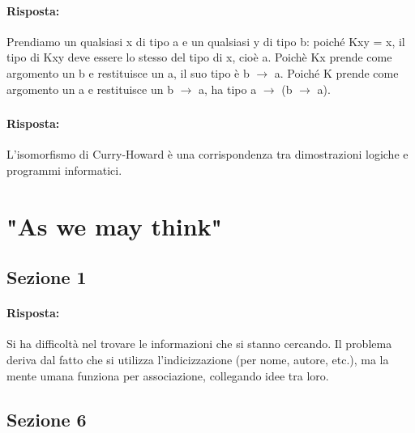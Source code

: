 \paragraph{Risposta:} Prendiamo un qualsiasi x di tipo a e un qualsiasi y di tipo b: poiché Kxy = x, il tipo di Kxy deve essere lo stesso del tipo di x, cioè a. Poichè Kx prende come argomento un b e restituisce un a, il suo tipo è b $\rightarrow$ a. Poiché K prende come argomento un a e restituisce un b $\rightarrow$ a, ha tipo a $\rightarrow$ (b $\rightarrow$ a).

\subsubsection{}


\paragraph{Risposta:} L'isomorfismo di Curry-Howard è una corrispondenza tra dimostrazioni logiche
e programmi informatici.

\section{"As we may think"}

\subsection{Sezione 1}


\paragraph{Risposta:} Si ha difficoltà nel trovare le informazioni che si stanno cercando.
Il problema deriva dal fatto che si utilizza l'indicizzazione (per nome, autore, etc.), ma 
la mente umana funziona per associazione, collegando idee tra loro.

\subsection{Sezione 6}



